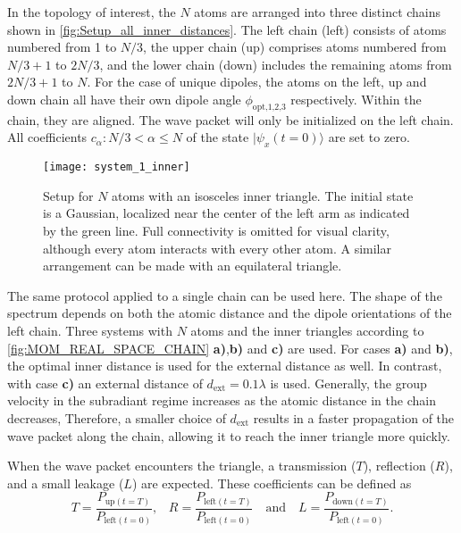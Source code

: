 \noindent
In the topology of interest, the $ N $ atoms are arranged into three distinct chains shown in \autoref{fig:Setup_all_inner_distances}.
The left chain (left) consists of atoms numbered from 1 to \( N/3  \),
the upper chain (up) comprises atoms numbered from \(  N/3  + 1 \) to \(  2N/3  \),
and the lower chain (down) includes the remaining atoms from \( 2N/3  + 1 \) to \( N \).
For the case of unique dipoles, the atoms on the left, up and down chain all have their own dipole angle $ \phi_{\text{opt,1,2,3}} $ respectively.
Within the chain, they are aligned.
The wave packet will only be initialized on the left chain.
All coefficients $ c_\alpha: { N/3 < \alpha \leq N} $ of the state $ \vert \psi_x(t = 0) \rangle $ are set to zero.

\begin{figure}[!ht]
    \centering
    \texttt{[image: system\_1\_inner]}
    \caption{Setup for $N$ atoms with an isosceles inner triangle.
    The initial state is a Gaussian, localized near the center of the left arm as indicated by the green line.
    Full connectivity is omitted for visual clarity, although every atom interacts with every other atom.
    A similar arrangement can be made with an equilateral triangle.}
    \label{fig:Setup_all_inner_distances}
\end{figure}

\noindent
The same protocol applied to a single chain can be used here.
The shape of the spectrum depends on both the atomic distance and the dipole orientations of the left chain.
Three systems with $N$ atoms and the inner triangles according to \autoref{fig:MOM_REAL_SPACE_CHAIN} \textbf{a)},\textbf{b)} and \textbf{c)}
are used.
For cases \textbf{a)} and \textbf{b)}, the optimal inner distance is used for the external distance as well.
In contrast, with case \textbf{c)} an external distance of  $ d_\text{ext} = 0.1 \lambda $ is used.
Generally, the group velocity in the subradiant regime increases as the atomic distance in the chain decreases,
Therefore, a smaller choice of \( d_\text{ext} \) results in a faster propagation of the wave packet along the chain, allowing it to reach the inner triangle more quickly.

\noindent
When the wave packet encounters the triangle, a transmission ($T$), reflection ($R$), and a small leakage ($L$) are expected.
These coefficients can be defined as
\begin{equation}
    T = \frac{P_{\text{up}(t=T)}}{P_{\text{left}(t=0)}} \text{,} \quad R = \frac{P_{\text{left}(t=T)}}{P_{\text{left}(t=0)}} \quad \text{and} \quad L = \frac{P_{\text{down}(t=T)}}{P_{\text{left}(t=0)}}\text{.}
\end{equation}

